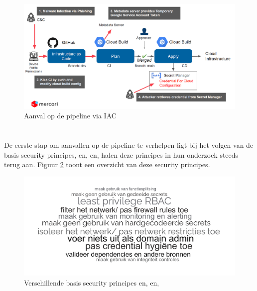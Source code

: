 \begin{figure}[H]
  \centering
  \includegraphics[scale=0.35]{graphics/IACAttack.png}
  \caption{\label{fig:IACAttack}Aanval op de pipeline via IAC \autocite{Suezawa2021}}
\end{figure}

\section{}
\label{sec:Beveiligingsmaatregelen om secrets te beschermen}

\subsection{}%
\label{sec:Secrets in versie beheer en basis security principes}
De eerste stap om aanvallen op de pipeline te verhelpen ligt bij het volgen van de basis security principes, \autocite{Smart2022} en,  \autocite{Haymore2022} en, \autocite{Suezawa2021} halen deze principes in hun onderzoek steeds terug aan. Figuur \ref{fig:wordcloudv2} toont een overzicht van deze security principes.
\newline 

\begin{figure}[H]
  \centering
  \includegraphics[scale=0.14]{graphics/wordcloudv2.png}
  \caption{\label{fig:wordcloudv2}Verschillende basis security principes \autocite{Smart2022} en, \autocite{Haymore2022} en, \autocite{Suezawa2021}}
\end{figure}

